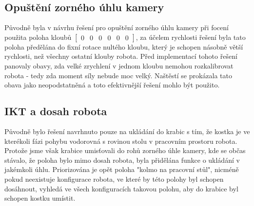 \documentclass[journal,twoside,web]{ieeecolor}
\begin{document}
        \subsection{Opuštění zorného úhlu kamery}
            Původně byla v návrhu řešení pro opuštění zorného úhlu kamery při focení použita poloha kloubů
            $\begin{bmatrix}
                0&0&0&0&0&0
            \end{bmatrix}$, za účelem rychlosti řešení byla tato poloha předělána do fixní rotace nultého kloubu, který je schopen
            násobně větší rychlosti, než všechny ostatní klouby robota. Před implementací tohoto řešení panovaly obavy, zda velké zrychlení v
            jednom kloubu nemohou rozkalibrovat robota - tedy zda moment síly nebude moc velký. Naštěstí se prokázala tato obava jako neopodstatněná
            a toto efektivnější řešení mohlo být použito.
            
        \subsection{IKT a dosah robota}
            Původně bylo řešení navrhnuto pouze na ukládání do krabic s tím, že kostka je ve kterékoli fázi pohybu vodorovná s rovinou stolu v pracovním prostoru
            robota. Protože jsme však krabice umisťovali do rohů zorného úhle kamery, kde se občas stávalo, že poloha bylo mimo dosah robota, byla přidělána
            funkce o ukládání v jakémkoli úhlu. Priorizována je opět poloha "kolmo na pracovní stůl",
            nicméně pokud neexistuje konfigurace robota, ve které by této polohy byl schopen dosáhnout, vyhledá ve všech konfiguracích takovou polohu,
            aby do krabice byl schopen kostku umístit.
\end{document}
